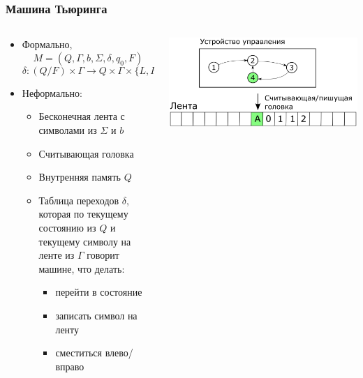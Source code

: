 \documentclass{../../slides-style}
\begin{document}
    \begin{frame}
        \frametitle{Машина Тьюринга}
        \begin{columns}
            \begin{column}{0.6\textwidth}
                \begin{itemize}
                    \item Формально,
                        $$M = (Q, \Gamma, b, \Sigma, \delta, q_0, F)$$
                        $$\delta : (Q / F) × \Gamma \rightarrow Q × \Gamma × \{L, R\}$$
                    \item Неформально:
                    \begin{itemize}
                        \item Бесконечная лента с символами из $\Sigma$ и $b$
                        \item Считывающая головка
                        \item Внутренняя память $Q$
                        \item Таблица переходов $\delta$, которая по текущему состоянию из $Q$ и текущему символу на ленте из $\Gamma$ говорит машине, что делать:
                        \begin{itemize}
                            \item перейти в состояние
                            \item записать символ на ленту
                            \item сместиться влево/вправо
                        \end{itemize}
                    \end{itemize}
                \end{itemize}
            \end{column}
            \begin{column}{0.4\textwidth}
                \begin{center}
                    \includegraphics[width=\textwidth]{turingMachine.png}
                \end{center}
            \end{column}
        \end{columns}
    \end{frame}
\end{document}
